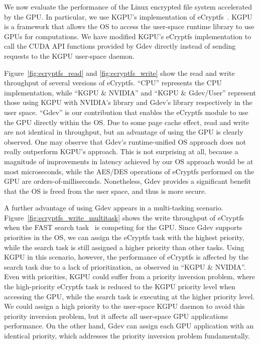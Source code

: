 We now evaluate the performance of the Linux encrypted file system
accelerated by the GPU.
In particular, we use KGPU's implementation of
eCryptfs~\cite{Sun_SYSTOR12}.
KGPU is a framework that allows the OS to access the user-space runtime
library to use GPUs for computations.
We have modified KGPU's eCryptfs implementation to call the CUDA API
functions provided by Gdev directly instead of sending requests to the
KGPU user-space daemon.

Figure~\ref{fig:ecryptfs_read} and \ref{fig:ecryptfs_write} show the
read and write throughput of several versions of eCryptfs.
``CPU'' represents the CPU implementation, while ``KGPU \& NVIDIA'' and
``KGPU \& Gdev/User'' represent those using KGPU with NVIDIA's library
and Gdev's library respectively in the user space. 
``Gdev'' is our contribution that enables the eCryptfs module to use the
GPU directly within the OS.
Due to some page cache effect, read and write are not identical in
throughput, but an advantage of using the GPU is clearly observed.
One may observe that Gdev's runtime-unified OS approach does not really
outperform KGPU's approach.
This is not surprising at all, because a magnitude of improvements in
latency achieved by our OS approach would be at most microseconds, while
the AES/DES operations of eCryptfs performed on the GPU are
orders-of-milliseconds.
Nonetheless, Gdev provides a significant benefit that the OS is freed
from the user space, and thus is more secure.

A further advantage of using Gdev appears in a multi-tasking scenario.
Figure~\ref{fig:ecryptfs_write_multitask} shows the write throughput of
eCryptfs when the FAST search task~\cite{Kim_SIGMOD10} is competing for
the GPU.
Since Gdev supports priorities in the OS, we can assign the eCryptfs
task with the highest priority, while the search task is still assigned
a higher priority than other tasks.
Using KGPU in this scenario, however, the performance of eCryptfs is
affected by the search task due to a lack of prioritization, as observed
in ``KGPU \& NVIDIA''.
Even with priorities, KGPU could suffer from a priority inversion
problem, where the high-priority eCryptfs task is reduced to the KGPU
priority level when accessing the GPU, while the search task is
executing at the higher priority level.
We could assign a high priority to the user-space KGPU daemon to avoid
this priority inversion problem, but it affects all user-space GPU
applications performance. 
On the other hand, Gdev can assign each GPU application with an
identical priority, which addresses the priority inversion problem
fundamentally.

